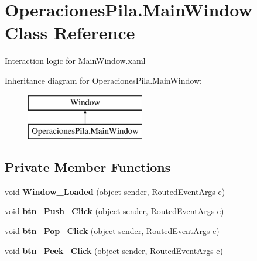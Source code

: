 \hypertarget{class_operaciones_pila_1_1_main_window}{}\section{Operaciones\+Pila.\+Main\+Window Class Reference}
\label{class_operaciones_pila_1_1_main_window}


Interaction logic for Main\+Window.\+xaml  


Inheritance diagram for Operaciones\+Pila.\+Main\+Window\+:\begin{figure}[H]
\begin{center}
\leavevmode
\includegraphics[height=2.000000cm]{class_operaciones_pila_1_1_main_window}
\end{center}
\end{figure}
\subsection*{Private Member Functions}
\begin{DoxyCompactItemize}
\item 
\mbox{\label{class_operaciones_pila_1_1_main_window_af8d318be544f2f5b8f807724115b69e2}} 
void {\bfseries Window\+\_\+\+Loaded} (object sender, Routed\+Event\+Args e)
\item 
\mbox{\label{class_operaciones_pila_1_1_main_window_af8d75db12c0004fd4cadbef9dd17db0f}} 
void {\bfseries btn\+\_\+\+Push\+\_\+\+Click} (object sender, Routed\+Event\+Args e)
\item 
\mbox{\label{class_operaciones_pila_1_1_main_window_a0977100f96e93631d8b42ee643af54c6}} 
void {\bfseries btn\+\_\+\+Pop\+\_\+\+Click} (object sender, Routed\+Event\+Args e)
\item 
\mbox{\label{class_operaciones_pila_1_1_main_window_af21abb9c245d4c891b5fe7249b525ece}} 
void {\bfseries btn\+\_\+\+Peek\+\_\+\+Click} (object sender, Routed\+Event\+Args e)
\end{DoxyCompactItemize}
